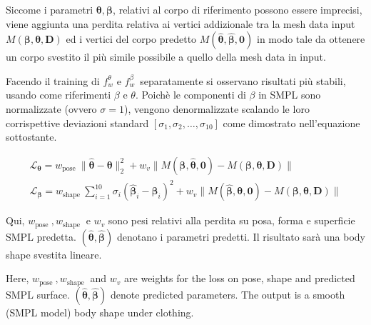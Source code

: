 \medskip

Siccome i parametri $\boldsymbol{\theta}, \boldsymbol{\beta}$, relativi al corpo di riferimento possono essere imprecisi, viene aggiunta una perdita relativa ai vertici addizionale tra la mesh data input $M(\boldsymbol{\beta}, \boldsymbol{\theta}, \mathbf{D})$ ed i vertici del corpo predetto $M(\hat{\boldsymbol{\theta}}, \hat{\boldsymbol{\beta}}, \mathbf{0})$ in modo tale da ottenere un corpo svestito il più simile possibile a quello della mesh data in input.

\medskip

Facendo il training di $f_{w}^{\theta}$ e $f_{w}^{\beta}$\ separatamente si osservano risultati più stabili, usando come riferimenti $\beta$ e $\theta$.
Poichè le componenti di $\beta$ in SMPL sono normalizzate (ovvero $\sigma=1$), vengono denormalizzate scalando le loro corrispettive deviazioni standard $\left[\sigma_{1}, \sigma_{2}, \ldots, \sigma_{10}\right]$ come dimostrato nell'equazione sottostante.

\medskip

\begin{equation*}
\begin{gathered}
\mathcal{L}_{\boldsymbol{\theta}}=w_{\text {pose }}\|\hat{\boldsymbol{\theta}}-\boldsymbol{\theta}\|_{2}^{2}+w_{v}\|M(\boldsymbol{\beta}, \hat{\boldsymbol{\theta}}, \mathbf{0})-M(\boldsymbol{\beta}, \boldsymbol{\theta}, \mathbf{D})\| \\
\mathcal{L}_{\boldsymbol{\beta}}=w_{\text {shape }} \sum_{i=1}^{10} \sigma_{i}\left(\hat{\boldsymbol{\beta}}_{i}-\boldsymbol{\beta}_{i}\right)^{2}+w_{v}\|M(\hat{\boldsymbol{\beta}}, \boldsymbol{\theta}, \boldsymbol{0})-M(\boldsymbol{\beta}, \boldsymbol{\theta}, \mathbf{D})\|
\end{gathered}
\end{equation*}

\medskip

Qui, $w_{\text {pose }}, w_{\text {shape }}$ e $w_{v}$ sono pesi relativi alla perdita su posa, forma e superficie SMPL predetta. $(\hat{\boldsymbol{\theta}}, \hat{\boldsymbol{\beta}})$ denotano i parametri predetti. Il risultato sarà una body shape svestita lineare.


Here, $w_{\text {pose }}, w_{\text {shape }}$ and $w_{v}$ are weights for the loss on pose, shape and predicted SMPL surface. $(\hat{\boldsymbol{\theta}}, \hat{\boldsymbol{\beta}})$ denote predicted parameters. The output is a smooth (SMPL model) body shape under clothing.

